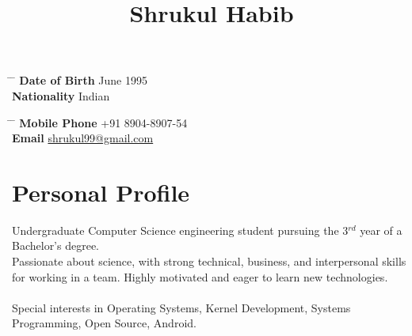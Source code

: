 \documentclass[10pt]{article} %
\begin{document}

\title{Shrukul Habib} %


\parbox{0.5\textwidth}{ %
\begin{tabbing} %
\hspace{3cm} \= \hspace{4cm} \= \kill %
{\bf Date of Birth}  June 1995 \\ %
{\bf Nationality} \> Indian %
\end{tabbing}}
\hfill %
\parbox{0.5\textwidth}{ %
\begin{tabbing} %
\hspace{3cm} \= \hspace{4cm} \= \kill %
{\bf Mobile Phone} \> +91 8904-8907-54 \\ %
{\bf Email} \> \href{mailto:shrukul99@gmail.com}{shrukul99@gmail.com} \\ %
\end{tabbing}}


\section{Personal Profile}

Undergraduate Computer Science engineering student pursuing the 3$^{rd}$ year of a Bachelor’s degree. \\
Passionate about science, with strong technical, business, and interpersonal skills for working 
in a team. Highly motivated and eager to learn new technologies. \\
\\
Special interests in Operating Systems, Kernel Development, Systems Programming,
Open Source, Android.

\end{document}
